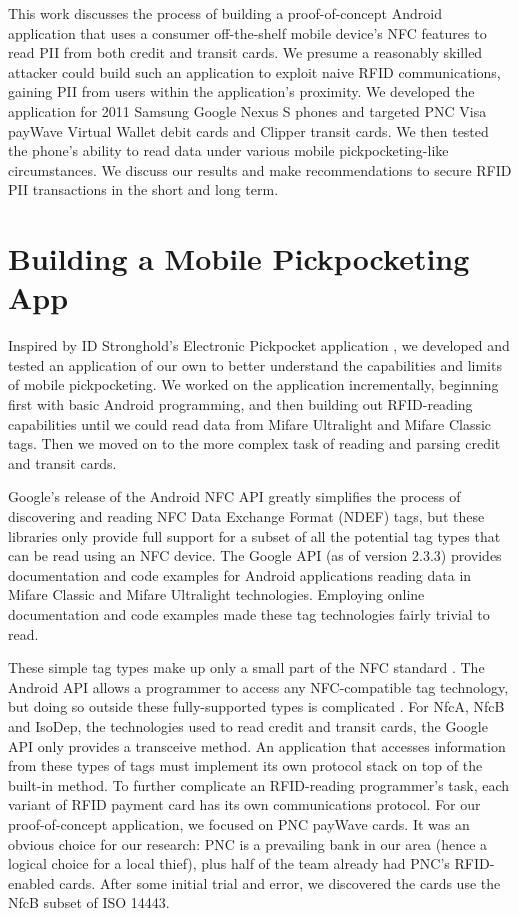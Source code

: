 \documentclass{IEEEtran}
\begin{document}
This work discusses the process of building a proof-of-concept Android application that uses a consumer off-the-shelf mobile device's NFC features to read PII from both credit and transit cards.  We presume a reasonably skilled attacker could build such an application to exploit naive RFID communications, gaining PII from users within the application's proximity.  We developed the application for 2011 Samsung Google Nexus S phones and targeted PNC Visa payWave Virtual Wallet debit cards and Clipper transit cards.  We then tested the phone's ability to read data under various mobile pickpocketing-like circumstances.  We discuss our results and make recommendations to secure RFID PII transactions in the short and long term.  

\section{Building a Mobile Pickpocketing App}
Inspired by ID Stronghold's Electronic Pickpocket application \cite{google-play-idstronghold}, we developed and tested an application of our own to better understand the capabilities and limits of mobile pickpocketing.  We worked on the application incrementally, beginning first with basic Android programming, and then building out RFID-reading capabilities until we could read data from Mifare Ultralight and Mifare Classic tags.  Then we moved on to the more complex task of reading and parsing credit and transit cards.    

Google's release of the Android NFC API greatly simplifies the process of discovering and reading NFC Data Exchange Format (NDEF) tags, but these libraries only provide full support for a subset of all the potential tag types that can be read using an NFC device. The Google API (as of version 2.3.3) provides documentation and code examples for Android applications reading data in Mifare Classic and Mifare Ultralight technologies.  Employing online documentation and code examples \cite{mifare-classic-detection-android} made these tag technologies fairly trivial to read.

These simple tag types make up only a small part of the NFC standard \cite{opennfc-1}.  The Android API allows a programmer to access any NFC-compatible tag technology, but doing so outside these fully-supported types is complicated \cite{android-developers-advanced-nfc}.  For NfcA, NfcB and IsoDep, the technologies used to read credit and transit cards, the Google API only provides a transceive method.  An application that accesses information from these types of tags must implement its own protocol stack on top of the built-in method.  To further complicate an RFID-reading programmer's task, each variant of RFID payment card has its own communications protocol.  For our proof-of-concept application, we focused on PNC payWave cards.  It was an obvious choice for our research: PNC is a prevailing bank in our area (hence a logical choice for a local thief), plus half of the team already had PNC's RFID-enabled cards.  After some initial trial and error, we discovered the cards use the NfcB subset of ISO 14443.  
\end{document}
